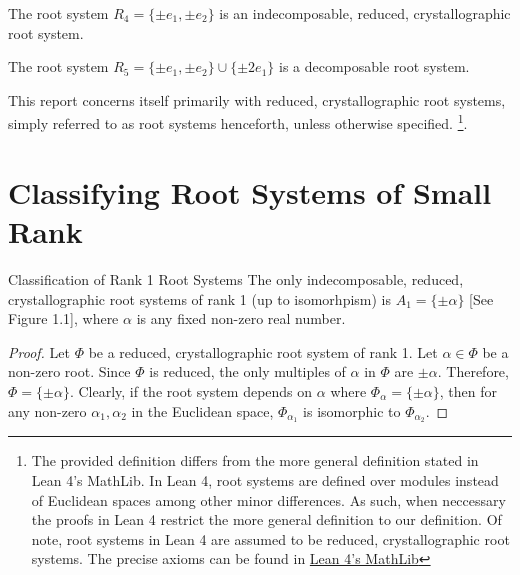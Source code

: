 \begin{example}
    The root system $R_4 = \{ \pm e_1, \pm e_2 \}$ is an indecomposable, reduced, crystallographic root system.
\end{example}

\begin{example}
    The root system $R_5 = \{ \pm e_1, \pm e_2 \} \cup \{ \pm 2 e_1 \}$ is a decomposable root system.
\end{example}

This report concerns itself primarily with reduced, crystallographic root systems, simply referred to as root systems henceforth,
unless otherwise specified. \footnote{
    The provided definition differs from the more general definition stated in Lean 4's MathLib.
    In Lean 4, root systems are defined over modules instead of Euclidean spaces among other minor differences.
    As such, when neccessary the proofs in Lean 4 restrict the more general definition to our definition.
    Of note, root systems in Lean 4 are assumed to be reduced, crystallographic root systems. The precise 
    axioms can be found in \hyperlink{https://leanprover-community.github.io/mathlib4_docs//Mathlib/LinearAlgebra/RootSystem/Defs.html}{Lean 4's MathLib}}. \newline

\section{Classifying Root Systems of Small Rank}

\begin{namedtheorem}{Classification of Rank 1 Root Systems}
    \leanok
    The only indecomposable, reduced, crystallographic root systems of rank 1 (up to isomorhpism) is $A_1 = \{ \pm \alpha \}$ [See Figure 1.1], where $\alpha$ is any fixed non-zero real number.
\end{namedtheorem}

\begin{proof}
    Let $\Phi$ be a reduced, crystallographic root system of rank 1.
    Let $\alpha \in \Phi$ be a non-zero root.
    Since $\Phi$ is reduced, the only multiples of $\alpha$ in $\Phi$ are $\pm \alpha$.
    Therefore, $\Phi = \{ \pm \alpha \}$.
    Clearly, if the root system depends on $\alpha$ where $\Phi_{\alpha} = \{ \pm \alpha \}$,
    then for any non-zero $\alpha_1, \alpha_2$ in the Euclidean space, $\Phi_{\alpha_1}$ is isomorphic
    to $\Phi_{\alpha_2}$.
\end{proof}

